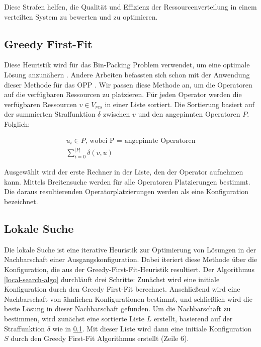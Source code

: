 \documentclass{article}
\begin{document}
Diese Strafen helfen, die Qualität und Effizienz der Ressourcenverteilung in einem verteilten System zu bewerten und zu optimieren.




\subsection{Greedy First-Fit} \label{greedy-first-fit}
Diese Heuristik wird für das Bin-Packing Problem verwendet, um eine optimale Lösung anzunähern \cite{greedy-first-fit}. 
Andere Arbeiten befassten sich schon  mit der Anwendung dieser Methode für das OPP \cite{k7, k8}.
Wir passen diese Methode an, um die Operatoren auf die verfügbaren Ressourcen zu platzieren. 
Für jeden Operator werden die verfügbaren Ressourcen $v \in V_{res}$ in einer Liste sortiert. Die Sortierung basiert auf der summierten Straffunktion $\delta$
zwischen $v$ und den angepinnten Operatoren $P$. Folglich:

\[ 
    \begin{gathered}
        u_i \in P \text{, wobei P = angepinnte Operatoren} \\
        \sum_{i=0}^{|P|} \delta(v, u)
    \end{gathered} 
\] 

Ausgewählt wird der erste Rechner in der Liste, den der Operator aufnehmen kann. Mittels Breitensuche werden für alle Operatoren Platzierungen bestimmt. 
Die daraus resultierenden Operatorplatzierungen werden als eine Konfiguration bezeichnet.




\subsection{Lokale Suche} \label{local-search}
Die lokale Suche ist eine iterative Heuristik zur Optimierung von Lösungen in der Nachbarschaft einer Ausgangskonfiguration. 
Dabei iteriert diese Methode über die Konfiguration, die aus der Greedy-First-Fit-Heuristik resultiert. 
Der Algorithmus \ref{local-search-algo} durchläuft drei Schritte: 
Zunächst wird eine initiale Konfiguration durch den Greedy First-Fit berechnet. 
Anschließend wird eine Nachbarschaft von ähnlichen Konfigurationen bestimmt, und schließlich wird die beste Lösung in dieser Nachbarschaft gefunden.
Um die Nachbarschaft zu bestimmen, wird zunächst eine sortierte Liste $L$ erstellt, basierend auf der Straffunktion $\delta$ wie in \ref{greedy-first-fit}.
Mit dieser Liste wird dann eine initiale Konfiguration $S$ durch den Greedy First-Fit Algorithmus erstellt (Zeile 6). \\
\end{document}
